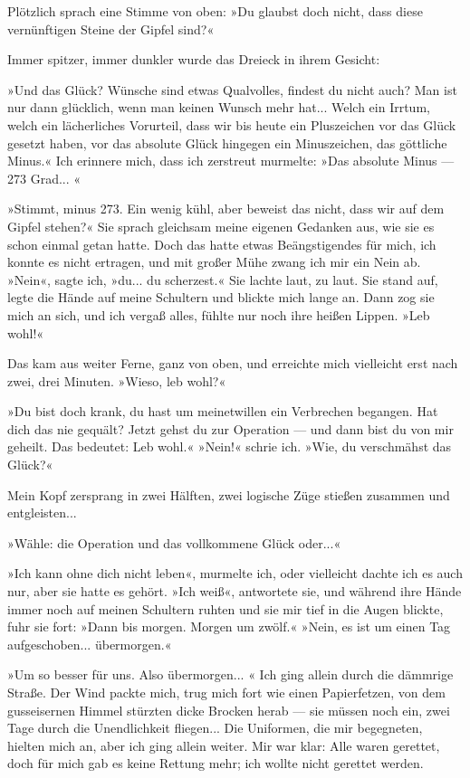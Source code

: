 Plötzlich sprach eine Stimme von oben: »Du glaubst doch nicht, dass
diese vernünftigen Steine der Gipfel sind?«

Immer spitzer, immer dunkler wurde das Dreieck in ihrem Gesicht:

»Und das Glück? Wünsche sind etwas Qualvolles, findest du nicht
auch? Man ist nur dann glücklich, wenn man keinen Wunsch mehr
hat... Welch ein Irrtum, welch ein lächerliches Vorurteil, dass wir
bis heute ein Pluszeichen vor das Glück gesetzt haben, vor das
absolute Glück hingegen ein Minuszeichen, das göttliche Minus.« Ich
erinnere mich, dass ich zerstreut murmelte: »Das absolute Minus —
273 Grad... «

»Stimmt, minus 273. Ein wenig kühl, aber beweist das nicht, dass
wir auf dem Gipfel stehen?« Sie sprach gleichsam meine eigenen
Gedanken aus, wie sie es schon einmal getan hatte. Doch das hatte
etwas Beängstigendes für mich, ich konnte es nicht ertragen, und
mit großer Mühe zwang ich mir ein Nein ab. »Nein«, sagte ich,
»du... du scherzest.« Sie lachte laut, zu laut. Sie stand auf,
legte die Hände auf meine Schultern und blickte mich lange an. Dann
zog sie mich an sich, und ich vergaß alles, fühlte nur noch ihre
heißen Lippen. »Leb wohl!«

Das kam aus weiter Ferne, ganz von oben, und erreichte mich
vielleicht erst nach zwei, drei Minuten. »Wieso, leb wohl?«

»Du bist doch krank, du hast um meinetwillen ein Verbrechen
begangen. Hat dich das nie gequält? Jetzt gehst du zur Operation —
und dann bist du von mir geheilt. Das bedeutet: Leb wohl.« »Nein!«
schrie ich. »Wie, du verschmähst das Glück?«

Mein Kopf zersprang in zwei Hälften, zwei logische Züge stießen
zusammen und entgleisten...

»Wähle: die Operation und das vollkommene Glück oder...«

»Ich kann ohne dich nicht leben«, murmelte ich, oder vielleicht
dachte ich es auch nur, aber sie hatte es gehört. »Ich weiß«,
antwortete sie, und während ihre Hände immer noch auf meinen
Schultern ruhten und sie mir tief in die Augen blickte, fuhr sie
fort: »Dann bis morgen. Morgen um zwölf.« »Nein, es ist um einen
Tag aufgeschoben... übermorgen.«

»Um so besser für uns. Also übermorgen... « Ich ging allein durch
die dämmrige Straße. Der Wind packte mich, trug mich fort wie einen
Papierfetzen, von dem gusseisernen Himmel stürzten dicke Brocken
herab — sie müssen noch ein, zwei Tage durch die Unendlichkeit
fliegen... Die Uniformen, die mir begegneten, hielten mich an, aber
ich ging allein weiter. Mir war klar: Alle waren gerettet, doch für
mich gab es keine Rettung mehr; ich wollte nicht gerettet werden.

